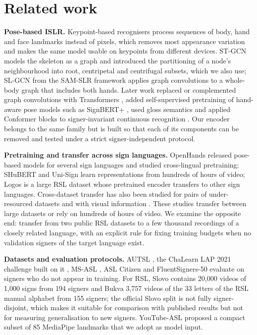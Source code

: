 \documentclass[a4paper,fleqn]{cas-dc}
\begin{document}
\hypertarget{related-work}{%
\section{Related work}\label{related-work}}

\textbf{Pose-based ISLR.} Keypoint-based recognisers process sequences of body, hand and face landmarks instead of pixels, which removes most appearance variation and makes the same model usable on keypoints from different devices. ST-GCN \cite{2018_yan_stgcn} models the skeleton as a graph and introduced the partitioning of a node's neighbourhood into root, centripetal and centrifugal subsets, which we also use; SL-GCN from the SAM-SLR framework \cite{2021_jiang_sam_slr} applies graph convolutions to a whole-body graph that includes both hands. Later work replaced or complemented graph convolutions with Transformers \cite{2017_vaswani_attention}, added self-supervised pretraining of hand-aware pose models such as SignBERT+ \cite{2023_hu_signbert_plus}, used gloss semantics \cite{2023_zuo_nla_slr} and applied Conformer blocks \cite{2020_gulati_conformer} to signer-invariant continuous recognition \cite{2025_isharah_signer_invariant_conformer}. Our encoder belongs to the same family but is built so that each of its components can be removed and tested under a strict signer-independent protocol.

\textbf{Pretraining and transfer across sign languages.} OpenHands \cite{2022_selvaraj_openhands} released pose-based models for several sign languages and studied cross-lingual pretraining; SHuBERT \cite{2025_gueuwou_shubert} and Uni-Sign \cite{2025_li_uni_sign} learn representations from hundreds of hours of video; Logos \cite{2025_ovodov_logos} is a large RSL dataset whose pretrained encoder transfers to other sign languages. Cross-dataset transfer has also been studied for pairs of under-resourced datasets \cite{2024_kindiroglu_cross_dataset_transfer} and with visual information \cite{2023_ryumin_cross_language_transfer}. These studies transfer between large datasets or rely on hundreds of hours of video. We examine the opposite end: transfer from two public RSL datasets to a few thousand recordings of a closely related language, with an explicit rule for fixing training budgets when no validation signers of the target language exist.

\textbf{Datasets and evaluation protocols.} AUTSL \cite{2020_sincan_autsl}, the ChaLearn LAP 2021 challenge built on it \cite{2021_sincan_chalearn_lap_islr}, MS-ASL \cite{2019_joze_msasl}, ASL Citizen \cite{2023_desai_asl_citizen} and FluentSigners-50 \cite{2022_mukushev_fluentsigners50} evaluate on signers who do not appear in training. For RSL, Slovo \cite{2023_kapitanov_slovo} contains 20,000 videos of 1,000 signs from 194 signers and Bukva \cite{2024_kvanchiani_bukva} 3,757 videos of the 33 letters of the RSL manual alphabet from 155 signers; the official Slovo split is not fully signer-disjoint, which makes it suitable for comparison with published results but not for measuring generalisation to new signers. YouTube-ASL \cite{2023_uthus_youtube_asl} proposed a compact subset of 85 MediaPipe landmarks that we adopt as model input.
\end{document}
